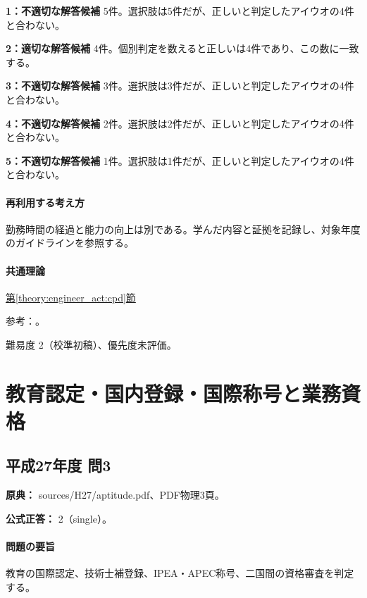 \noindent\textbf{1：不適切な解答候補} 5件。選択肢は5件だが、正しいと判定したアイウオの4件と合わない。\par

\noindent\textbf{2：適切な解答候補} 4件。個別判定を数えると正しいは4件であり、この数に一致する。\par

\noindent\textbf{3：不適切な解答候補} 3件。選択肢は3件だが、正しいと判定したアイウオの4件と合わない。\par

\noindent\textbf{4：不適切な解答候補} 2件。選択肢は2件だが、正しいと判定したアイウオの4件と合わない。\par

\noindent\textbf{5：不適切な解答候補} 1件。選択肢は1件だが、正しいと判定したアイウオの4件と合わない。\par

\paragraph{再利用する考え方} 勤務時間の経過と能力の向上は別である。学んだ内容と証拠を記録し、対象年度のガイドラインを参照する。

\paragraph{共通理論} \hyperref[theory:engineer_act:cpd]{第\ref*{theory:engineer_act:cpd}節}

\par 参考：\cite{cpd_new2021,cpd_v3}。

\par 難易度 2（校準初稿）、優先度未評価。

\section{教育認定・国内登録・国際称号と業務資格}

\subsection{平成27年度 問3}
\label{q:h27-reg-apt-03}

\noindent\textbf{原典：} sources/H27/aptitude.pdf、PDF物理3頁。

\textbf{公式正答：} 2（single）。

\paragraph{問題の要旨} 教育の国際認定、技術士補登録、IPEA・APEC称号、二国間の資格審査を判定する。

